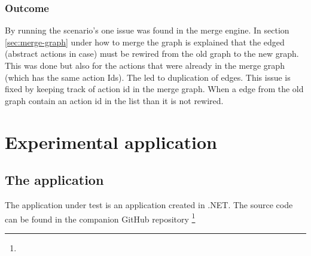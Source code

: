 \subsubsection{Outcome}
By running the scenario's one issue was found in the merge engine. In section \ref{sec:merge-graph} under how to merge the graph is explained that the edged (abstract actions in \testar case) must be rewired from the old graph to the new graph. This was done but also for the actions that were already in the merge graph (which has the same action Ids). The led to duplication of edges. This issue is fixed by keeping track of action id in the merge graph. When a edge from the old graph contain an action id in the list than it is not rewired.

\section{Experimental application} \label{sec:experimental-application}

\subsection{The application}
The application under test is an application created in .NET. The source code can be found in the companion GitHub repository \footnote{}

